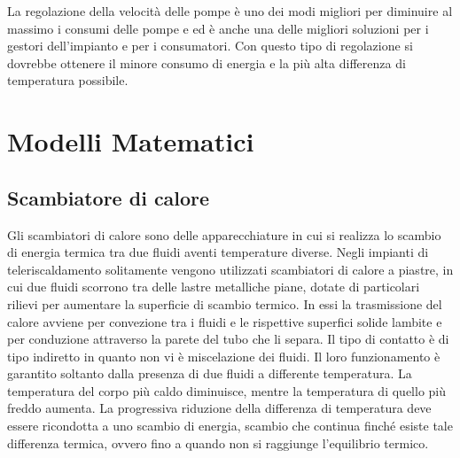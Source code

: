 \documentclass[laurea,oneside,11pt]{USiena_tesiLM}
\begin{document}
La regolazione della velocità delle pompe è uno dei modi migliori per diminuire al massimo i consumi delle pompe e ed è anche una delle migliori soluzioni per i gestori dell'impianto e per i consumatori. Con questo tipo di regolazione si dovrebbe ottenere il minore consumo di energia e la più alta differenza di temperatura possibile.

%
%
%


\chapter{Modelli Matematici}

\section{Scambiatore di calore}
\label{subsec:scambiatore_di_calore}
Gli scambiatori di calore sono  delle apparecchiature in cui si realizza lo scambio di energia termica tra due fluidi aventi temperature diverse. Negli impianti di teleriscaldamento solitamente vengono utilizzati scambiatori di calore a piastre, in cui due fluidi scorrono tra delle lastre metalliche piane, dotate di particolari rilievi per aumentare la superficie di scambio termico. In essi la trasmissione del calore avviene per convezione tra i fluidi e le rispettive superfici solide lambite e per conduzione attraverso la parete del tubo che li separa. Il tipo di contatto è di tipo indiretto in quanto non vi è miscelazione dei fluidi.
Il loro funzionamento è garantito soltanto dalla presenza di due fluidi a differente temperatura. La temperatura del corpo più caldo diminuisce, mentre la temperatura di quello più freddo aumenta. La progressiva riduzione della differenza di temperatura deve essere ricondotta a uno scambio di energia, scambio che continua finché esiste tale differenza termica, ovvero fino a quando non si raggiunge l'equilibrio termico. 
\end{document}
